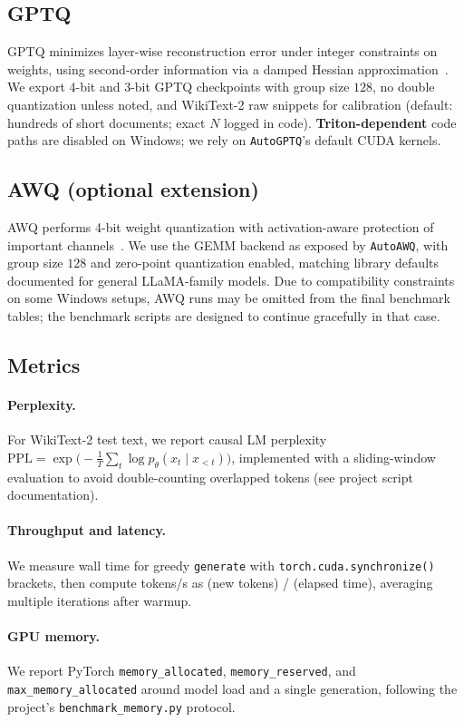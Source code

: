 \documentclass[11pt]{article}
\begin{document}
\subsection{GPTQ}
GPTQ minimizes layer-wise reconstruction error under integer constraints on weights, using second-order information
via a damped Hessian approximation~\citep{frantar2023gptq}.
We export 4-bit and 3-bit GPTQ checkpoints with group size $128$, no double quantization unless noted,
and WikiText-2 raw snippets for calibration (default: hundreds of short documents; exact $N$ logged in code).
\textbf{Triton-dependent} code paths are disabled on Windows; we rely on \texttt{AutoGPTQ}'s default CUDA kernels.

\subsection{AWQ (optional extension)}
AWQ performs 4-bit weight quantization with activation-aware protection of important channels~\citep{lin2023awq}.
We use the GEMM backend as exposed by \texttt{AutoAWQ}, with group size $128$ and zero-point quantization enabled,
matching library defaults documented for general LLaMA-family models.
Due to compatibility constraints on some Windows setups, AWQ runs may be omitted from the final benchmark tables;
the benchmark scripts are designed to continue gracefully in that case.

\subsection{Metrics}
\paragraph{Perplexity.}
For WikiText-2 test text, we report causal LM perplexity
$\mathrm{PPL} = \exp\bigl(-\tfrac{1}{T}\sum_{t}\log p_\theta(x_t \mid x_{<t})\bigr)$,
implemented with a sliding-window evaluation to avoid double-counting overlapped tokens (see project script documentation).

\paragraph{Throughput and latency.}
We measure wall time for greedy \texttt{generate} with \texttt{torch.cuda.synchronize()} brackets,
then compute tokens/s as (new tokens) / (elapsed time), averaging multiple iterations after warmup.

\paragraph{GPU memory.}
We report PyTorch \texttt{memory\_allocated}, \texttt{memory\_reserved}, and \texttt{max\_memory\_allocated}
around model load and a single generation, following the project's \texttt{benchmark\_memory.py} protocol.
\end{document}
